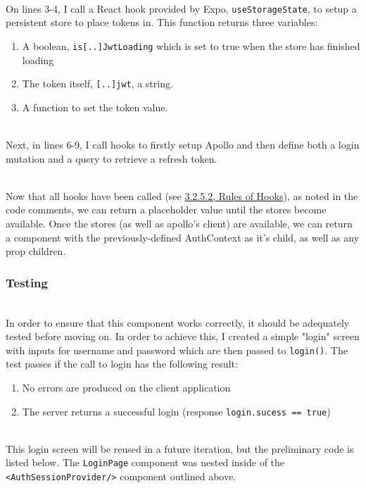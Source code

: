 \documentclass[../../main.tex]{subfiles}
\begin{document}
\noindent \\ On lines 3-4, I call a React hook provided by Expo,
\lstinline{useStorageState}, to setup a persistent store to place
tokens in. This function returns three variables:

\begin{enumerate}
  \item A boolean, \lstinline{is[..]JwtLoading} which is set to true
        when the store has finished loading

  \item The token itself, \lstinline{[..]jwt}, a string.

  \item A function to set the token value.
\end{enumerate}


\noindent \\ Next, in lines 6-9, I call hooks to firstly setup Apollo
and then define both a login mutation and a query to retrieve a refresh
token.

\noindent \\ Now that all hooks have been called (see \underline{3.2.5.2, Rules of Hooks}), as noted in
the code comments, we can return a placeholder value until the stores
become available. Once the stores (as well as apollo's client)
are available, we can return a component with the previously-defined
AuthContext as it's child, as well as any prop children.

\subsubsection{Testing}

\noindent \\ In order to ensure that this component works correctly,
it should be adequately tested before moving on. In order to achieve
this, I created a simple "login" screen with inputs for username
and password which are then passed to \lstinline{login()}.
The test passes if the call to login has the following result:
\begin{enumerate}
  \item No errors are produced on the client application
  \item The server returns a successful login
        (response \lstinline{login.sucess == true})
\end{enumerate}

\noindent \\ This login screen will be reused in a future iteration,
but the preliminary code is listed below. The \lstinline{LoginPage}
component was nested inside of the \lstinline{<AuthSessionProvider/>}
component outlined above.
\end{document}
